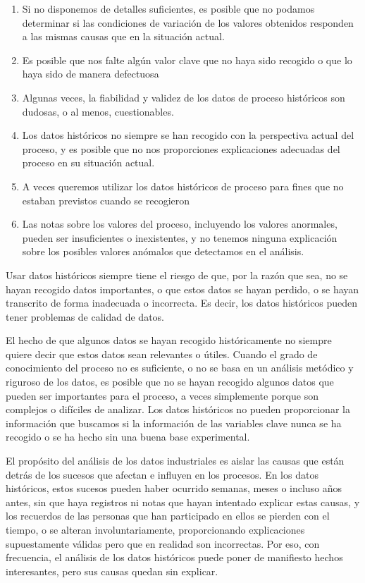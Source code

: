 \documentclass[
  letterpaper,
]{scrbook}
\providecommand{\tightlist}{%
  \setlength{\itemsep}{0pt}\setlength{\parskip}{0pt}}\usepackage{longtable,booktabs,array}
\begin{document}
\begin{enumerate}
\def\labelenumi{\arabic{enumi}.}
\tightlist
\item
  Si no disponemos de detalles suficientes, es posible que no podamos
  determinar si las condiciones de variación de los valores obtenidos
  responden a las mismas causas que en la situación actual.
\item
  Es posible que nos falte algún valor clave que no haya sido recogido o
  que lo haya sido de manera defectuosa
\item
  Algunas veces, la fiabilidad y validez de los datos de proceso
  históricos son dudosas, o al menos, cuestionables.
\item
  Los datos históricos no siempre se han recogido con la perspectiva
  actual del proceso, y es posible que no nos proporciones explicaciones
  adecuadas del proceso en su situación actual.
\item
  A veces queremos utilizar los datos históricos de proceso para fines
  que no estaban previstos cuando se recogieron
\item
  Las notas sobre los valores del proceso, incluyendo los valores
  anormales, pueden ser insuficientes o inexistentes, y no tenemos
  ninguna explicación sobre los posibles valores anómalos que detectamos
  en el análisis.
\end{enumerate}

Usar datos históricos siempre tiene el riesgo de que, por la razón que
sea, no se hayan recogido datos importantes, o que estos datos se hayan
perdido, o se hayan transcrito de forma inadecuada o incorrecta. Es
decir, los datos históricos pueden tener problemas de calidad de datos.

El hecho de que algunos datos se hayan recogido históricamente no
siempre quiere decir que estos datos sean relevantes o útiles. Cuando el
grado de conocimiento del proceso no es suficiente, o no se basa en un
análisis metódico y riguroso de los datos, es posible que no se hayan
recogido algunos datos que pueden ser importantes para el proceso, a
veces simplemente porque son complejos o difíciles de analizar. Los
datos históricos no pueden proporcionar la información que buscamos si
la información de las variables clave nunca se ha recogido o se ha hecho
sin una buena base experimental.

El propósito del análisis de los datos industriales es aislar las causas
que están detrás de los sucesos que afectan e influyen en los procesos.
En los datos históricos, estos sucesos pueden haber ocurrido semanas,
meses o incluso años antes, sin que haya registros ni notas que hayan
intentado explicar estas causas, y los recuerdos de las personas que han
participado en ellos se pierden con el tiempo, o se alteran
involuntariamente, proporcionando explicaciones supuestamente válidas
pero que en realidad son incorrectas. Por eso, con frecuencia, el
análisis de los datos históricos puede poner de manifiesto hechos
interesantes, pero sus causas quedan sin explicar.
\end{document}
